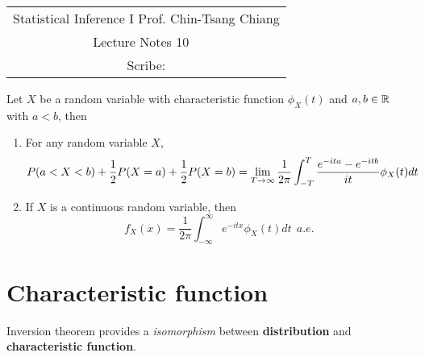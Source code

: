 \documentclass[../Transformation.tex]{subfiles}
\begin{document}
	\begin{center}
		\renewcommand{\arraystretch}{2}
		\begin{bfseries}
			\begin{tabular}{|c|}
				\hline
				Statistical Inference I \hfill Prof. Chin-Tsang Chiang\\
				\hspace{15em} {\large Lecture Notes 10} \hspace{15em}\ \\
				\lecdate \hfill Scribe: \scribe\\
				\hline
			\end{tabular}
			\renewcommand{\arraystretch}{1}
		\end{bfseries}
	\end{center}
	
\begin{lemma}
	Let $X$ be a random variable with characteristic function $\phi_X(t)$ and $a,b\in{\mathbb R}$ with $a<b$, then
	\begin{enumerate}
		\item For any random variable $X$,
		$$P(a<X<b) + \frac{1}{2}P(X=a) + \frac{1}{2}P(X=b) = \lim_{T\rightarrow\infty}\frac{1}{2\pi}\int_{-T}^{T}\frac{e^{-ita}-e^{-itb}}{it}\phi_X(t)dt$$
		\item If $X$ is a continuous random variable, then
		$$f_X(x) = \frac{1}{2\pi}\int_{-\infty}^{\infty}e^{-itx}\phi_X(t)dt\ \ a.e.$$
	\end{enumerate}
\end{lemma}
\section{Characteristic function}
\begin{intuition}
	Inversion theorem provides a {\it isomorphism} between {\bf distribution} and {\bf characteristic function}.
\end{intuition}
\end{document}

